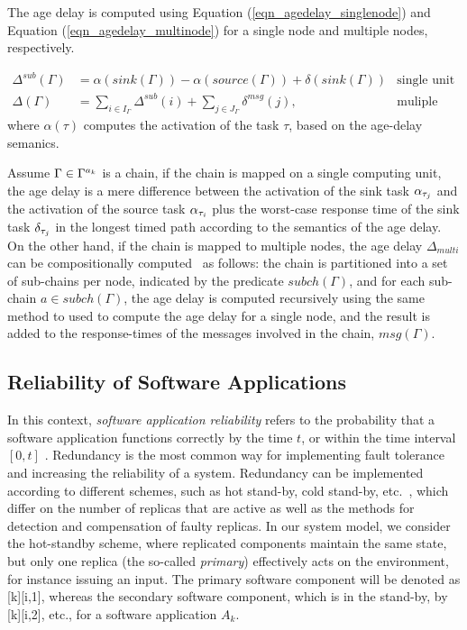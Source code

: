 {The age delay is computed using Equation (\ref{eqn_agedelay_singlenode}) and Equation (\ref{eqn_agedelay_multinode}) for a single node and multiple nodes, respectively.

\begin{align}
	\label{eqn_agedelay_singlenode}
	\Delta^{sub}(\Gamma) &= \alpha(sink(\Gamma))-\alpha(source(\Gamma)) + \delta(sink(\Gamma)) & \text{single unit}\\
	\label{eqn_agedelay_multinode}
	\Delta(\Gamma)&=\sum_{i\in I_{\Gamma}}{\Delta^{sub}(i)} + \sum_{j\in  J_{\Gamma}}{\delta^{msg}(j)}, &\text{muliple units}
\end{align}
where $\alpha(\tau)$ computes the activation of the task $\tau$, based on the age-delay semanics.

Assume $\Gamma \in \ssp{\Gamma}$ is a chain, if the chain is mapped on a single computing unit, the age delay is a mere difference between the activation of the sink task $\ssb{\alpha}[\tau_j]$ and the activation of the source task $\ssb{\alpha}[\tau_i]$ plus the worst-case response time of the sink task $\ssb{\delta}[\tau_j]$ in the longest timed path according to the semantics of the age delay. On the other hand, if the chain is mapped to multiple nodes, the age delay $\Delta_{multi}$ can be compositionally computed~\cite{Feiertag2009ASemantics} as follows: the chain is partitioned  into a set of sub-chains per node, indicated by the predicate $subch(\Gamma)$, and for each sub-chain $a\in subch(\Gamma)$, the age delay is computed recursively using the same method to used to compute the age delay for a single node, and the result is added to the response-times of the messages involved in the chain, $msg(\Gamma)$.

\subsection{Reliability of Software Applications}\label{sub_reliability}
In this context, \textit{software application reliability} refers to the probability that a software application functions correctly by the time $t$, or within the time interval $[0, t]$ \cite{Goel1985SoftwareApplicability}. Redundancy is the most common way for implementing fault tolerance and increasing the reliability of a system. Redundancy can be implemented according to different schemes, such as hot stand-by, cold stand-by, etc.~\cite{Dubrova2013Fault-tolerantDesign}, which differ on the number of replicas that are active as well as the methods for detection and compensation of faulty replicas. In our system model, we consider the hot-standby scheme, where replicated components maintain the same state, but only one replica (the so-called \textit{primary}) effectively acts on the environment, for instance issuing an input. The primary software component will be denoted as [k][i,1], whereas the secondary software component, which is in the stand-by, by [k][i,2], etc., for a software application $A_k$.

}
